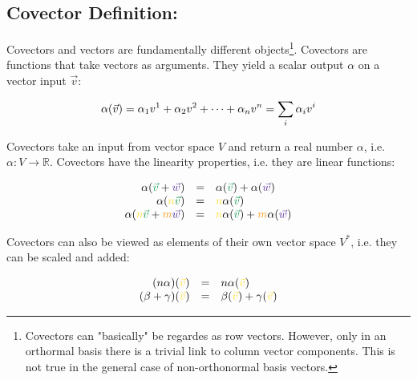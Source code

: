 \subsection{Covector Definition:}

Covectors and vectors are fundamentally different objects\footnote{Covectors can
"basically" be regardes as row vectors. However, only in an orthormal basis there is a
trivial link to column vector components. This is not true in the general case of
non-orthonormal basis vectors.}. Covectors are functions that take vectors as arguments.
They yield a scalar output $\alpha$ on a vector input $\vec{v}$:

\begin{equation}
    \alpha(\vec{v}) = \alpha_1 v^1 + \alpha_2 v^2 + \dots + \alpha_n v^n =
    \sum\limits_{i}\alpha_i v^{i} 
\end{equation}

Covectors take an input from vector space $V$ and return a real number $\alpha$, i.e.
$\alpha: V \rightarrow \mathbb{R}$. Covectors have the linearity properties, i.e. they are
linear functions:

\begin{equation}
    \label{eq:covector_linearity}
    \begin{array}{rcl}
        \alpha(\textcolor{ForestGreen}{\vec{v}}+\textcolor{RoyalPurple}{\vec{w}}) & = &
        \alpha(\textcolor{ForestGreen}{\vec{v}})+\alpha(\textcolor{RoyalPurple}{\vec{w}}) \\
        \alpha(\textcolor{Goldenrod}{n}\textcolor{ForestGreen}{\vec{v}}) & = &
        \textcolor{Goldenrod}{n}\alpha(\textcolor{ForestGreen}{\vec{v}}) \\
        \alpha(\textcolor{Goldenrod}{n}\textcolor{ForestGreen}{\vec{v}}+
        \textcolor{YellowOrange}{m}\textcolor{RoyalPurple}{\vec{w}}) & = &
        \textcolor{Goldenrod}{n}\alpha(\textcolor{ForestGreen}{\vec{v}})+
        \textcolor{YellowOrange}{m}\alpha(\textcolor{RoyalPurple}{\vec{w}})
    \end{array}
\end{equation}

Covectors can also be viewed as elements of their own vector space $V^*$, i.e. they can be
scaled and added:

\begin{equation}
    \label{eq:covector_add_scale}
    \begin{array}{rcl}
        (n\alpha)(\hdv) & = &
        n\alpha(\hdv)\\
        (\beta + \gamma)(\hdv) & = &
        \beta(\hdv)+ \gamma(\hdv)
    \end{array}
\end{equation}

